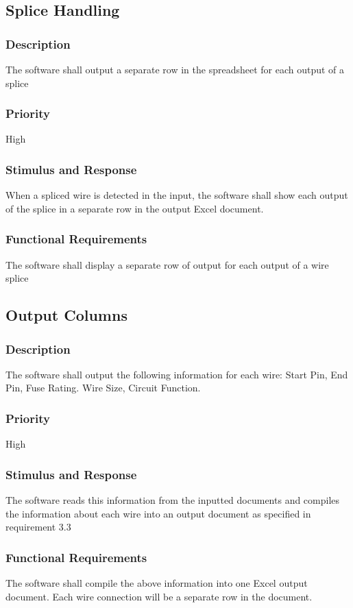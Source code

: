  \subsection{Splice Handling}
\subsubsection{Description}
 The software shall output a separate row in the spreadsheet for each output of a splice
\subsubsection{Priority}
High

\subsubsection{Stimulus and Response}
When a spliced wire is detected in the input, the software shall show each output of the splice in a separate row in the output Excel document.

\subsubsection{Functional Requirements}
 The software shall display a separate row of output for each output of a wire splice
 
  \subsection{Output Columns}
\subsubsection{Description}
The software shall output the following information for each wire:
Start Pin, End Pin, Fuse Rating. Wire Size, Circuit Function.
\subsubsection{Priority}
High

\subsubsection{Stimulus and Response}
The software reads this information from the inputted documents and compiles the information about each wire into an output document  as specified in requirement 3.3

\subsubsection{Functional Requirements}
 The software shall compile the above information into one Excel output document. Each wire connection will be a separate row in the document.
 
